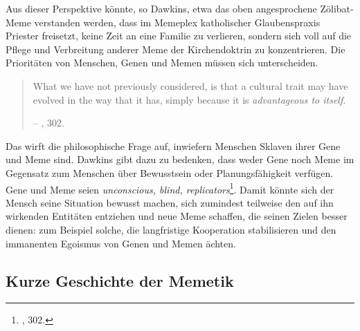 \documentclass[openany,twoside,twocolumn]{book}
\let\rmarkdownfootnote\footnote%
\def\footnote{\protect\rmarkdownfootnote}
\begin{document}
Aus dieser Perspektive könnte, so Dawkins, etwa das oben angesprochene Zölibat-Meme verstanden werden, dass im Memeplex katholischer Glaubenspraxis Priester freisetzt, keine Zeit an eine Familie zu verlieren, sondern sich voll auf die Pflege und Verbreitung anderer Meme der Kirchendoktrin zu konzentrieren. Die Prioritäten von Menschen, Genen und Memen müssen sich unterscheiden.

\begin{quote}
What we have not previously considered, is that a cultural trait may have evolved in the way that it has, simply because it is \emph{advantageous to itself}.

-- \textcite{Dawkinsselfishgene40th2016}, 302.
\end{quote}

Das wirft die philosophische Frage auf, inwiefern Menschen Sklaven ihrer Gene und Meme sind. Dawkins gibt dazu zu bedenken, dass weder Gene noch Meme im Gegensatz zum Menschen über Bewusstsein oder Planungsfähigkeit verfügen. Gene und Meme seien \emph{unconscious, blind, replicators}\footnote{\textcite{Dawkinsselfishgene40th2016}, 302.}. Damit könnte sich der Mensch seine Situation bewusst machen, sich zumindest teilweise den auf ihn wirkenden Entitäten entziehen und neue Meme schaffen, die seinen Zielen besser dienen: zum Beispiel solche, die langfristige Kooperation stabilisieren und den immanenten Egoismus von Genen und Memen ächten.

\hypertarget{memetics-history}{%
\subsection{Kurze Geschichte der Memetik}\label{memetics-history}}
\end{document}
